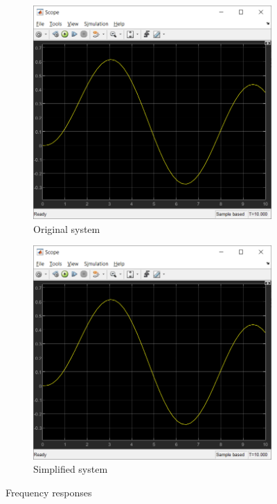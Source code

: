 \documentclass{article}
\begin{document}
\begin{figure}[H]
   	 \centering
     \begin{subfigure}[b]{0.45\textwidth}
         \centering
         \includegraphics[width=\textwidth]{sources/image2_4.png}
         \caption{Original system}
         \label{fig:fig6}
     \end{subfigure}
     \hfill
     \begin{subfigure}[b]{0.45\textwidth}
         \centering
         \includegraphics[width=\textwidth]{sources/image2_5.png}
         \caption{Simplified system}
         \label{fig:fig7}
     \end{subfigure}
     \caption{Frequency responses}
\end{figure}
\end{document}
